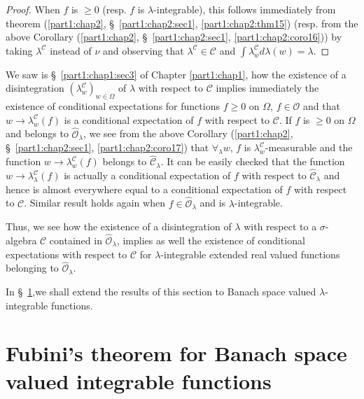 \begin{proof}
When $f$ is $\geq 0$ (resp. $f$ is $\lambda$-integrable), this follows
immediately from theorem (\ref{part1:chap2},
\S\ \ref{part1:chap2:sec1}, \ref{part1:chap2:thm15}) (resp. from the
above 
Corollary (\ref{part1:chap2}, \S\ \ref{part1:chap2:sec1},
\ref{part1:chap2:coro16})) by taking $\lambda^\mathscr{C}$ instead of 
$\nu$ and observing that $\lambda^\mathscr{C} \in \mathscr{C}$ and
$\int \lambda^\mathscr{C}_w d \lambda (w) = \lambda $. 
\end{proof}

We saw is \S\ \ref{part1:chap1:sec3} of Chapter \ref{part1:chap1}, how
the existence of a disintegration 
$(\lambda^\mathscr{C}_w)_{w \in \Omega}$ of $\lambda$ with respect to
$\mathscr{C}$ implies immediately the existence of conditional
expectations for functions $f \geq 0$ on $\Omega$, $f \in\mathscr{O}$
and that $w \to \lambda^\mathscr{C}_w (f)$ is a conditional
expectation of $f$ with respect to $\mathscr{C}$. If $f$ is  $\geq 0$
on $\Omega$ and belongs to $\hat{\mathscr{O}}_\lambda$, we see from
the above Corollary (\ref{part1:chap2}, \S\ \ref{part1:chap2:sec1},
\ref{part1:chap2:coro17}) that $\forall_\lambda w$, $f$ is 
$\lambda^\mathscr{C}_w $-measurable and the function $w \to
\lambda^\mathscr{C}_w (f)$ belongs to $\hat{\mathscr{C}}_\lambda$. It
can be easily checked that the function $w \to
\lambda^\mathscr{C}_\lambda (f)$ is actually a conditional expectation
of $f$ with respect to $\hat{\mathscr{C}}_\lambda$ and hence is almost
everywhere equal to a conditional expectation of $f$ with respect to
$\mathscr{C}$. Similar result holds again when $f \in
\hat{\mathscr{O}}_\lambda$ and is $\lambda$-integrable. 

Thus, we see how the existence of a disintegration of $\lambda$ with
respect to a $\sigma$-algebra $\mathscr{C}$ contained in
$\hat{\mathscr{O}}_\lambda$, implies as well the existence of
conditional expectations with respect to $\mathscr{C}$ for 
$\lambda$-integrable extended real valued functions belonging to
$\hat{\mathscr{O}}_\lambda$. 

In \S\ \ref{part1:chap2:sec2},\pageoriginale we shall extend the
results of this section 
to Banach space valued $\lambda$-integrable functions. 

\section[Fubini's theorem for Banach space...]{Fubini's theorem for
  Banach space valued integrable 
  functions}\label{part1:chap2:sec2}

